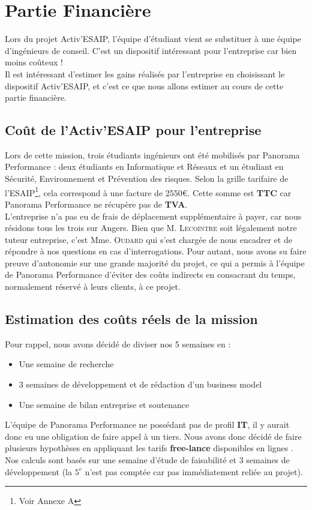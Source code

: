 \section{Partie Financière}

Lors du projet Activ'ESAIP, l'équipe d'étudiant vient se substituer à une équipe d'ingénieurs de conseil. C'est un dispositif intéressant pour l'entreprise car bien moins coûteux !\\

Il est intéressant d'estimer les gains réalisés par l'entreprise en choisissant le dispositif Activ'ESAIP, et c'est ce que nous allons estimer au cours de cette partie financière.

\subsection{Coût de l'Activ'ESAIP pour l'entreprise}

Lors de cette mission, trois étudiants ingénieurs ont été mobilisés par Panorama Performance : deux étudiants en Informatique et Réseaux et un étudiant en Sécurité, Environnement et Prévention des risques. Selon la grille tarifaire de l'ESAIP\footnote{Voir Annexe A}, cela correspond à une facture de 2550\euro. Cette somme est \textbf{TTC} car Panorama Performance ne récupère pas de \textbf{TVA}.\\

L'entreprise n'a pas eu de frais de déplacement supplémentaire à payer, car nous résidons tous les trois sur Angers. Bien que M. \textsc{Lecointre} soit légalement notre tuteur entreprise, c'est Mme. \textsc{Oudard} qui s'est chargée de nous encadrer et de répondre à nos questions en cas d'interrogations. Pour autant, nous avons su faire preuve d'autonomie sur une grande majorité du projet, ce qui a permis à l'équipe de Panorama Performance d'éviter des coûts indirects en consacrant du temps, normalement réservé à leurs clients, à ce projet. 

\subsection{Estimation des coûts réels de la mission}

Pour rappel, nous avons décidé de diviser nos 5 semaines en : 
\begin{itemize}
    \item Une semaine de recherche
    \item 3 semaines de développement et de rédaction d'un business model
    \item Une semaine de bilan entreprise et soutenance
\end{itemize}
L'équipe de Panorama Performance ne possédant pas de profil \textbf{IT}, il y aurait donc eu une obligation de faire appel à un tiers. Nous avons donc décidé de faire plusieurs hypothèses en appliquant les tarifs \textbf{free-lance} disponibles en lignes \cite{SalaireFreeLance}. Nos calculs sont basés sur une semaine d'étude de faisabilité et 3 semaines de développement (la $5^{e}$ n'est pas comptée car pas immédiatement reliée au projet).\\

